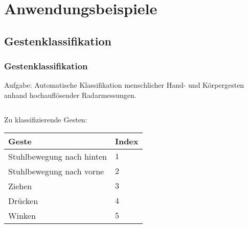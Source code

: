 \documentclass[16pt]{beamer}
\begin{document}
\section{Anwendungsbeispiele}

\frame{\sectionpage}


\subsection{Gestenklassifikation}
\begin{frame}
\frametitle{Gestenklassifikation}
\begin{block}{Aufgabe: }
	Automatische Klassifikation menschlicher Hand- und Körpergesten anhand hochauflösender Radarmessungen. 
\end{block} 
\vspace{0.2cm}
\begin{columns}
	\begin{column}[t]{5.4cm}
		Zu klassifizierende Gesten: \\
		\vspace{0.2cm}
			\begin{tabular}{|P{4.4cm}|P{0.8cm}|}
				\hline
				Geste & Index \\
				\hline\hline
				Stuhlbewegung nach hinten & $1$ \\ %
				\hline
				Stuhlbewegung nach vorne  & $2$ \\ %
				\hline
				Ziehen					  & $3$ \\ %
				\hline
				Drücken					  & $4$ \\ %
				\hline
				Winken				  	  & $5$\\ %
				\hline
			\end{tabular}

\end{column}
\end{columns}
\end{frame}
\end{document}
